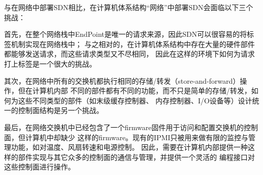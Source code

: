 与在网络中部署SDN相比，在计算机体系结构“网络”中部署SDN会面临以下三个挑战：

首先，在整个网络栈中EndPoint是唯一的请求来源，因此SDN可以很容易的将标签机制实现在网络栈中；
与之相对的，在计算机体系结构中存在大量的硬件部件都能够发送请求，而这些请求类型又不尽相同，
因此在这样的环境下如何为请求打上标签是一个很大的挑战。

其次，在网络中所有的交换机都执行相同的存储/转发（store-and-forward）操作，但在计算机内部
不同的部件都有不同的功能，而不只是简单的存储/转发，如何为这些不同类型的部件（如末级缓存控制器、
内存控制器、I/O设备等）设计统一的控制面结构是另一个挑战。

最后，在网络交换机中已经包含了一个firmware固件用于访问和配置交换机的控制面，但计算机中却缺少
这样的firmware。现有的IPMI只被用来做有限的监控与管理功能，如对温度、风扇转速和电源控制。
因此，需要在计算机内部提供一种这样的部件实现与其它众多的控制面的通信与管理，并提供一个灵活的
编程接口对这些控制面进行操作。

\fi
